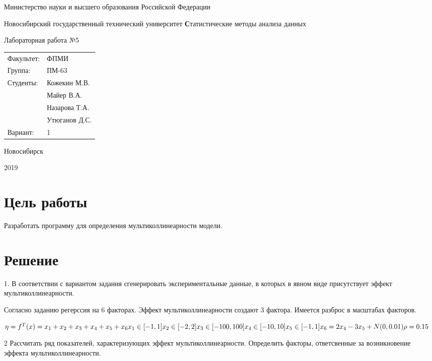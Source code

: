 ﻿\documentclass[12pt, a4paper]{article}
\newcommand{\insertTitle}[9]{
\begin{titlepage}
	\begin{center}
    	\large
		Министерство науки и высшего образования Российской Федерации
		
		Новосибирский государственный технический университет
		\vfill
		{\textbf #1}
		
		Лабораторная работа №#2
		\vfill
	\end{center}
	
	\begin{tabular}{ m{7em}  m{7em} }
	Факультет: & ФПМИ \\ 
	Группа: & #3 \\  
	Студенты: & #4 \\
			   & #5 \\
			   & #6 \\
			   & #7 \\	
	Вариант: & #8
	\end{tabular}
	\vfill

\begin{center}
Новосибирск

#9
\end{center}
\end{titlepage}
}
\begin{document}
\setlength{\abovedisplayskip}{1pt}
\setlength{\belowdisplayskip}{1pt}



\insertTitle{Статистические методы анализа данных}{5}{ПМ-63}{Кожекин М.В.}{Майер В.А.}{Назарова Т.А.}{Утюганов Д.С.}{1}{2019}




\section{Цель работы}
Разработать программу для определения мультиколлинеарности модели.




\section{Решение}

1.	В соответствии с вариантом задания сгенерировать экспериментальные данные, в которых в явном виде присутствует эффект мультиколлинеарности.

Согласно заданию регерссия на 6 факторах. Эффект мультиколлинеарности создают 3 фактора. Имеется разброс в масштабах факторов.

\(
\eta = f^T(x) =  x_1 + x_2 + x_3 + x_4 + x_5 + x_6 \\
x_1 \in [-1, 1] \\
x_2 \in [-2, 2] \\
x_3 \in [-100, 100] \\
x_4 \in [-10, 10] \\
x_5 \in [-1, 1] \\
x_6  = 2 x_4 - 3 x_5 + N(0, 0.01)\\
\rho = 0.15
\)



2 Рассчитать ряд показателей, характеризующих эффект мультиколлинеарности. Определить факторы, ответсвенные за возникновение  эффекта мультиколлинеарности.
\end{document}
